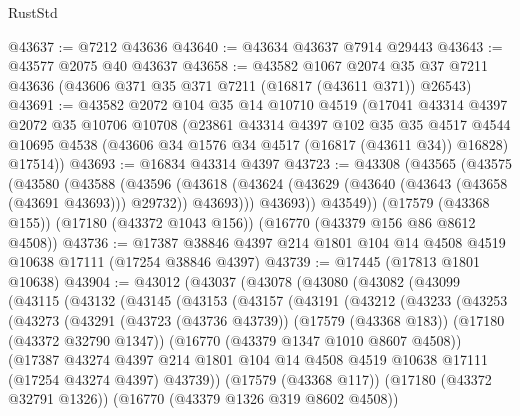 \begin{lexlean}{RustStd}
\begin{coremodule}
@43637 := @7212 @43636
@43640 := @43634 @43637 @7914 @29443
@43643 := @43577 @2075 @40 @43637
@43658 := @43582
    @1067
    @2074
    @35
    @37
    @7211
    @43636
    (@43606 @371 @35 @371 @7211 (@16817 (@43611 @371)) @26543)
@43691 := @43582
    @2072
    @104
    @35
    @14
    @10710
    @4519
    (@17041
      @43314
      @4397
      @2072
      @35
      @10706
      @10708
      (@23861
        @43314
        @4397
        @102
        @35
        @35
        @4517
        @4544
        @10695
        @4538
        (@43606 @34 @1576 @34 @4517 (@16817 (@43611 @34)) @16828)
        @17514))
@43693 := @16834 @43314 @4397
@43723 := @43308
    (@43565
      (@43575
        (@43580
          (@43588
            (@43596
              (@43618 (@43624 (@43629 (@43640 (@43643 (@43658 (@43691 @43693))) @29732)) @43693)))
            @43693))
        @43549))
    (@17579 (@43368 @155))
    (@17180 (@43372 @1043 @156))
    (@16770 (@43379 @156 @86 @8612 @4508))
@43736 := @17387 @38846 @4397 @214 @1801 @104 @14 @4508 @4519 @10638 @17111 (@17254 @38846 @4397)
@43739 := @17445 (@17813 @1801 @10638)
@43904 := @43012
    (@43037
      (@43078
        (@43080
          (@43082
            (@43099
              (@43115
                (@43132
                  (@43145
                    (@43153
                      (@43157
                        (@43191
                          (@43212
                            (@43233
                              (@43253
                                (@43273
                                  (@43291
                                    (@43723 (@43736 @43739))
                                    (@17579 (@43368 @183))
                                    (@17180 (@43372 @32790 @1347))
                                    (@16770 (@43379 @1347 @1010 @8607 @4508))
                                    (@17387
                                      @43274
                                      @4397
                                      @214
                                      @1801
                                      @104
                                      @14
                                      @4508
                                      @4519
                                      @10638
                                      @17111
                                      (@17254 @43274 @4397)
                                      @43739))
                                  (@17579 (@43368 @117))
                                  (@17180 (@43372 @32791 @1326))
                                  (@16770 (@43379 @1326 @319 @8602 @4508))

\end{coremodule}
\end{lexlean}

